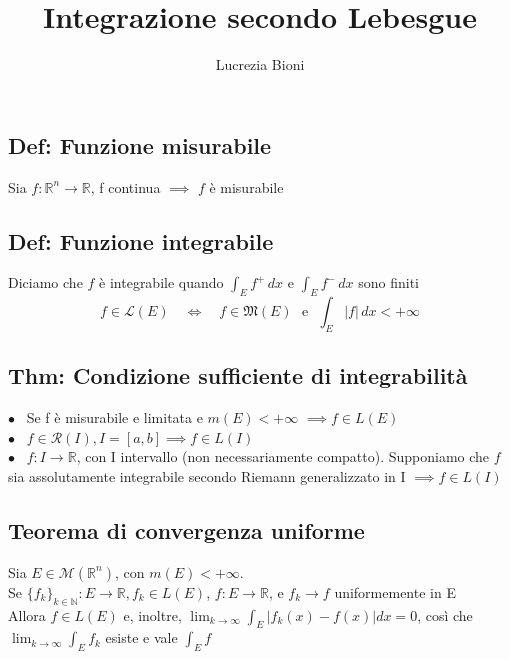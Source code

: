 \documentclass{article} %
\title{Integrazione secondo Lebesgue} %
\author{Lucrezia Bioni} %
\date{} %
\begin{document}
    \maketitle

    \subsection*{Def: Funzione misurabile}
    Sia $f:\mathbb{R} ^n \to \mathbb{R} $, f continua $\implies$ $f$ è misurabile  

    \subsection*{Def: Funzione integrabile}
    Diciamo che $f$ è integrabile quando $\int_{E}^{ }f^+\,dx$ e $\int_{E}^{ }f^-\,dx$ sono finiti
    $$ f \in \mathcal{L} (E) \, \, \, \, \, \,  \Longleftrightarrow \, \, \, \, \, \,  f \in \mathfrak{M} (E) \,\, \, \,  \text{e} \,\, \, \,  \int_{E}^{ }|f|\,dx < +\infty  $$

    \subsection*{Thm: Condizione sufficiente di integrabilità}
    $\bullet$ \, Se f è misurabile e limitata e $m(E) < + \infty$ $\implies f \in L(E)$ \\
    $\bullet$ \, $f \in \mathcal{R} (I), I=[a,b] \implies f \in L(I)$ \\
    $\bullet$ \, $f: I \to \mathbb{R}$, con I intervallo (non necessariamente compatto). Supponiamo che $f$ sia assolutamente integrabile secondo Riemann generalizzato in I $\implies f \in L(I)$

    \subsection*{Teorema di convergenza uniforme}
    Sia $E \in \mathcal{M}(\mathbb{R}^n)$, con $m(E) < + \infty$. \\ Se $\{f_k\}_{k \in \mathbb{N}}: E \to \mathbb{R}, f_k \in L(E)$, $f:E \to \mathbb{R}$, e $f_k \to f$ uniformemente in E \\
    Allora $f \in L(E)$ e, inoltre, $\lim_{k \to \infty} \int_E \left| f_k(x) - f(x) \right|dx=0$, così che $\lim_{k \to \infty} \int_E f_k$ esiste e vale $\int_E f$
\end{document}
